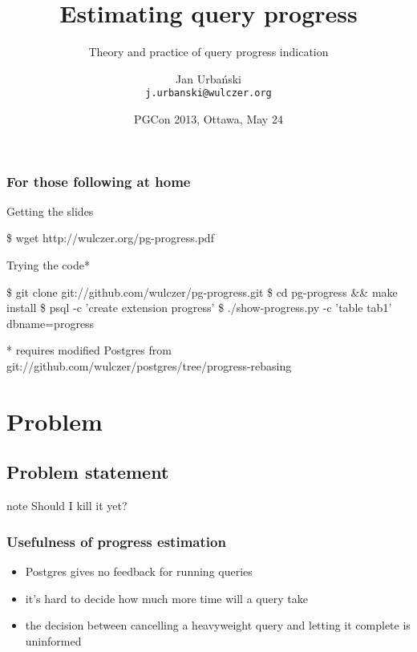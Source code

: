 \documentclass{beamer}
\title{Estimating query progress}
\subtitle{Theory and practice of query progress indication}
\author[Jan Urbański]{Jan Urbański \\ \texttt{j.urbanski@wulczer.org}}
\institute{Ducksboard}
\date[PGCon 2013]{PGCon 2013, Ottawa, May 24}
\begin{document}
\frame{\titlepage}

\begin{frame}[fragile]
  \frametitle{For those following at home}

  \begin{block}{Getting the slides}
    \begin{semiverbatim}
    \$ wget http://wulczer.org/pg-progress.pdf
    \end{semiverbatim}
  \end{block}

  \begin{block}{Trying the code\alert{*}}
    \begin{semiverbatim}
    \$ git clone git://github.com/wulczer/pg-progress.git
    \$ cd pg-progress && make install
    \$ psql -c 'create extension progress'
    \$ ./show-progress.py -c 'table tab1' dbname=progress
    \end{semiverbatim}
  \end{block}

  {\tiny\alert{*} requires modified Postgres from git://github.com/wulczer/postgres/tree/progress-rebasing}
\end{frame}

\begin{frame}
  \tableofcontents
\end{frame}

\section{Problem}
\subsection{Problem statement}

\begin{frame}
\begin{beamercolorbox}[center]{note}
  \Huge Should I kill it yet?
\end{beamercolorbox}
\end{frame}

\begin{frame}
  \frametitle{Usefulness of progress estimation}

  \begin{itemize}
  \item Postgres gives no feedback for running queries
  \item it's hard to decide how much more time will a query take
  \item the decision between cancelling a heavyweight query and letting it
    complete is uninformed
  \end{itemize}
\end{frame}
\end{document}
